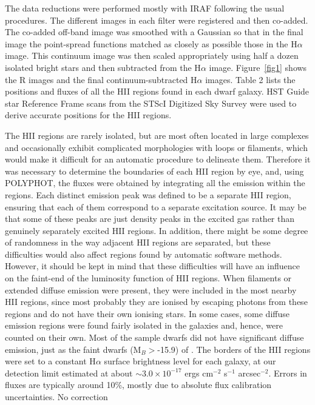 \documentclass[preprint]{aastex}
\begin{document}
The data reductions were performed mostly with IRAF following the usual 
procedures. The different images in each filter were registered and then 
co-added. The co-added off-band image was smoothed with a Gaussian so that 
in the final image the point-spread functions matched as closely as possible
those in the H$\alpha$ image. This continuum image was then scaled 
appropriately using half a dozen isolated bright stars and then 
subtracted from the H$\alpha$ image. Figure~\ref{fig1} shows the R images
and the final continuum-subtracted H$\alpha$ images. Table 2 lists
the positions and fluxes of all the HII regions found in each dwarf galaxy.
HST Guide star Reference Frame scans from the STScI Digitized Sky Survey
were used to derive accurate positions for the HII regions.

The HII regions are rarely isolated, but are most often located in large complexes
and occasionally exhibit complicated morphologies with loops or 
filaments, which would make it difficult for an automatic procedure to 
delineate them. Therefore it was necessary to determine the boundaries of
each HII region by eye, and, using POLYPHOT, the fluxes were obtained by 
integrating all the emission within the regions. 
Each distinct emission peak was defined to be a separate HII region,
ensuring that each of them correspond to a separate excitation source.
It may be that some of these peaks are just density peaks in the excited gas
rather than genuinely separately excited HII regions. In addition, 
there might be some degree of randomness
in the way adjacent HII regions are separated, but these
difficulties would also affect regions found by automatic software methods.
However, it should be kept in mind that these difficulties will have an 
influence on the faint-end of the luminosity function of HII regions.
When filaments or extended diffuse emission were present, they were 
included in the most nearby HII regions, since most probably they are ionised
by escaping photons from these regions and do not have their own ionising 
stars. In some cases, some diffuse emission regions were found fairly 
isolated in the galaxies and, hence, were counted on their own.
Most of the sample dwarfs did not have significant diffuse emission,
just as the faint dwarfs (M$_B >$-15.9) of \citet{shk91}.
The borders of the HII regions
were set to a constant H$\alpha$ surface brightness level for each galaxy,
at our detection limit estimated at about $\sim 3.0 \times 10^{-17}$ 
ergs cm$^{-2}$ s$^{-1}$ arcsec$^{-2}$. Errors in fluxes are typically around
10\%, mostly due to absolute flux calibration uncertainties. No correction 
\end{document}
